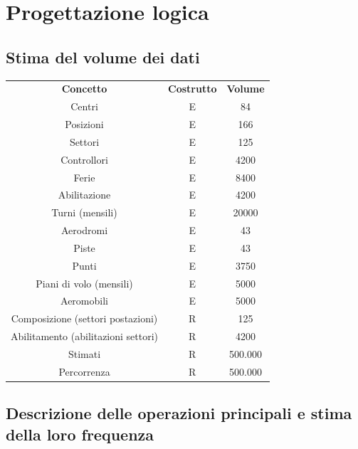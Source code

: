 \chapter{Progettazione logica}
\section{Stima del volume dei dati}
\begin{table}[H]
  \centering
  \begin{tabular}{ccc}
    \rowcolor{tableheadercolor}
    \textbf{Concetto} & \textbf{Costrutto} & \textbf{Volume} \\
    Centri & E & 84 \\
    Posizioni & E & 166 \\
    Settori & E & 125 \\
    Controllori & E & 4200 \\
    Ferie & E & 8400 \\
    Abilitazione & E & 4200 \\
    Turni (mensili) & E & 20000 \\
    Aerodromi & E & 43 \\
    Piste & E & 43 \\
    Punti & E & 3750 \\
    Piani di volo (mensili) & E & 5000 \\
    Aeromobili & E & 5000 \\
    Composizione (settori postazioni) & R & 125 \\
    Abilitamento (abilitazioni settori) & R & 4200 \\
    Stimati & R & 500.000 \\
    Percorrenza & R & 500.000 \\
  \end{tabular}
  \end{table}
  \section{Descrizione delle operazioni principali e stima della loro frequenza}

